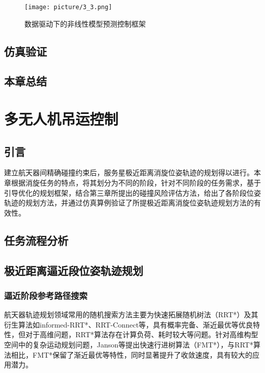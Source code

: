 \documentclass[lang=chs, degree=master, blindreview=false, winfonts=true]{yanputhesis}
\begin{document}
\begin{figure}[hbt!]
	\centering
	\texttt{[image: picture/3\_3.png]} 
	\caption{数据驱动下的非线性模型预测控制框架} \label{illustration_framework}
\end{figure}
\section{仿真验证}


\section{本章总结}




\cleardoublepage

\chapter{多无人机吊运控制}

\section{引言}
建立航天器间精确碰撞约束后，服务星极近距离消旋位姿轨迹的规划得以进行。本章根据消旋任务的特点，将其划分为不同的阶段，针对不同阶段的任务需求，基于引导优化的规划框架，结合第三章所提出的碰撞风险评估方法，给出了各阶段位姿轨迹的规划方法，并通过仿真算例验证了所提极近距离消旋位姿轨迹规划方法的有效性。

\section{任务流程分析}




\section{极近距离逼近段位姿轨迹规划}
\subsection{逼近阶段参考路径搜索}
航天器轨迹规划领域常用的随机搜索方法主要为快速拓展随机树法（RRT*）及其衍生算法如informed-RRT*、RRT-Connect等，具有概率完备、渐近最优等优良特性，但对于高维问题，RRT*算法存在计算负荷、耗时较大等问题。针对高维构型空间中的复杂运动规划问题，Janson等提出快速行进树算法（FMT*）\cite{jansonFastMarchingTree2015}，与RRT*算法相比，FMT*保留了渐近最优等特性，同时显著提升了收敛速度，具有较大的应用潜力。
\end{document}
